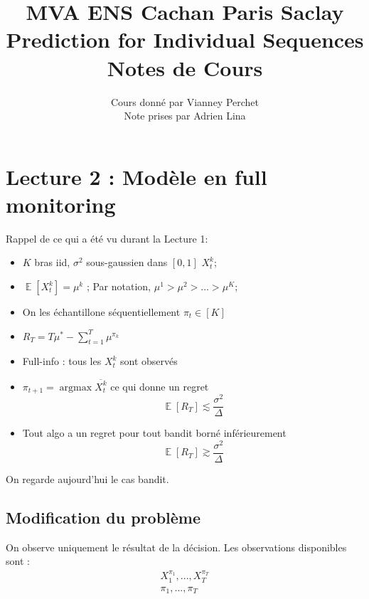 \documentclass{article}
\DeclareMathOperator*{\argmax}{argmax}
\DeclareMathOperator*{\E}{\mathbb{E}}
\theoremstyle{remark}
\theoremstyle{remark}
\begin{document}
\title{%
  \large MVA ENS Cachan Paris Saclay \\
  \huge Prediction for Individual Sequences\\ Notes de Cours \\
}
\author{%
  Cours donné par Vianney Perchet \\
  Note prises par Adrien Lina
}

\maketitle

\section{Lecture 2 : Modèle en full monitoring}

Rappel de ce qui a été vu durant la Lecture 1:
\begin{itemize}
   \item $K$ bras iid, $\sigma^2$ sous-gaussien dans $[0,1]$ $X_t^k$;
   \item $\E[X_t^k] = \mu^k$ ; Par notation, $\mu^1 > \mu^2 > ... > \mu^K$;
   \item On les échantillone séquentiellement $\pi_t \in [K]$
   \item $R_T = T \mu^* - \sum\limits_{t=1}^T \mu^{\pi_k}$
   \item Full-info : tous les $X_t^k$ sont observés
   \item $\pi_{t+1} = \argmax \overline{X_t^k}$ ce qui donne un regret \\
      $$
      \E[R_T] \lesssim \frac{\sigma^2}{\Delta}
      $$
   \item Tout algo a un regret pour tout bandit borné inférieurement
      $$
      \E[R_T] \gtrsim \frac{\sigma^2}{\Delta}
      $$
\end{itemize}

On regarde aujourd'hui le cas bandit.

\subsection{Modification du problème}

On observe uniquement le résultat de la décision. Les observations disponibles sont :
\begin{align*}
   X_1^{\pi_1}, ..., X_T^{\pi_T} \\
   \pi_1, ..., \pi_T
\end{align*}
\end{document}
